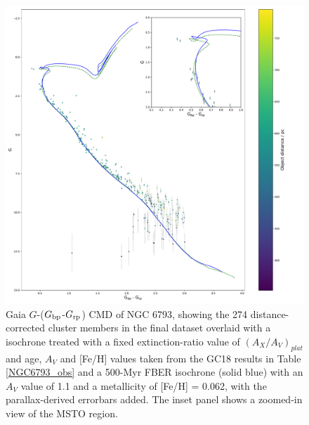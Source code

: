 \documentclass[12pt, a4paper]{report}
\begin{document}
\begin{figure}[h!]
\begin{center}
\includegraphics[width=1.0\textwidth]{../NGC_6793_CMD_FeH_0p062_Av_1p1_500Myr_all_xloge_correction_no_xerr_isochrones_summary_errorbars.pdf}
\caption{Gaia $G$-($G_{\textnormal{bp}}$-$G_{\textnormal{rp}}$) CMD of NGC 6793, showing the 274 distance-corrected cluster members in the final dataset overlaid with a isochrone treated with a fixed extinction-ratio value of $(A_{X}/A_{V})_{plat}$ and age, $A_{V}$ and [Fe/H] values taken from the GC18 results in Table \ref{NGC6793_obs} and a 500-Myr FBER isochrone (solid blue) with an $A_{V}$ value of 1.1 and a metallicity of [Fe/H] = 0.062, with the parallax-derived errorbars added. The inset panel shows a zoomed-in view of the MSTO region.}
\label{NGC_6793_isoc_inset_1.1_500_0.062}
\end{center}
\end{figure}
\end{document}
